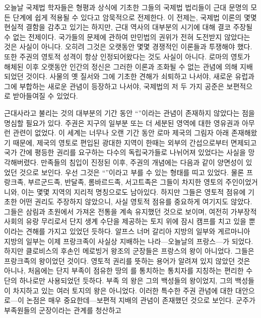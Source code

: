 오늘날 국제법 학자들은
형평과 상식에 기초한
그들의 국제법 법리들이
근대 문명의 모든 단계에 쉽게 적용될 수 있다고
암묵적으로 전제한다.
이 전제는, 국제법 이론의 몇몇 현실적 결함을 감추고 있기는 하지만,
근대 역사의 대부분의 시기에 대해 결코 주장될 수 없는 전제이다.
국가들의 문제에 관하여 만민법의 권위가
전혀 도전받지 않았다는 것은 사실이 아니다.
오히려 그것은 오랫동안 몇몇 경쟁적인 이론들과 투쟁해야 했다.
또한 주권의 영토적 성격이 항상 인정되어왔다는 것도 사실이 아니다.
로마의 영토가 해체된 이후 오랫동안 인간의 정신은 그러한 이론과
조화될 수 없는 관념에 의해 지배되었던 것이다.
사물의 옛 질서와 그에 기초한 견해가 쇠퇴하고 나서야,
새로운 유럽과 그에 부합하는 새로운 관념이 등장하고 나서야,
국제법의 저 두 가지 공준은 보편적으로 받아들여질 수 있었다.

근대사라고 불리는 것의 대부분의 기간 동안
``''이라는 관념이
존재하지 않았다는 점을 명심할 필요가 있다.
주권은 지구의 일부분 또는 더 세분된 영역에 대한 영유권과
아무런 관련이 없었다.
이 세계는 너무나 오랜 기간 동안 로마 제국의 그림자 아래 존재해왔기 때문에,
제국의 영토로 편입된 광대한 지역이 한때는
외부의 간섭으로부터 면제되고 국가 간에 평등한 권리를 요구하는
다수의 독립국가들로 나뉘어져 있었다는 사실을 망각해버렸다.
만족들의 침입이 진정된 이후,
주권의 개념에는 다음과 같이 양면성이 있었던 것으로 보인다.
우선 그것은 ``''이라고 부를 수 있는
형태를 띠고 있었다.
물론
프랑크족, 부르군드족, 반달족, 롬바르드족, 서고트족은
그들이 차지한 영토의 주인이었거니와,
이는 몇몇 지역의 지리적 명칭으로도 남아있다.
하지만 그들은 영토적 점유에 기초한 어떤 권리도 주장하지 않았으니,
사실 영토적 점유를 중요하게 여기지도 않았다.
그들은 삼림과 초원에서 가져온 전통을 계속 유지했던 것으로 보이며,
여전히 가부장적 사회의 유랑 무리로서
단지 생계 수단을 제공하는 토지 위에 잠시
캠프를 치고 있을 뿐이라는 견해를 가지고 있었던 듯하다.
알프스 너머 갈리아 지방의 일부와 게르마니아 지방의 일부는
이제 프랑크족이 사실상 지배하는 나라---오늘날의 프랑스---가 되었다.
하지만 클로비스의 후손인 메로빙거 왕조의 군장들은
프랑스의 왕이 아니었다. 그들은 프랑크족의 왕이었던 것이다.
영토적 권리를 뜻하는 용어가 알려져 있지 않았던 것은 아니나,
처음에는 단지 부족이 점유한 땅의 를
통치하는 통치자를 지칭하는 편리한 수단의 하나로만 사용되었던 듯하다.
부족 의 왕은 그의 백성들의 왕이었지,
그의 백성들이 차지하고 있는 여러 토지의 왕은 아니었다.
이러한 특수한 주권 관념에 대한
대안으로---이 논점은 매우 중요한데---보편적 지배의 관념이
존재했던 것으로 보인다.
군주가 부족원들의 군장이라는 관계를 청산하고

